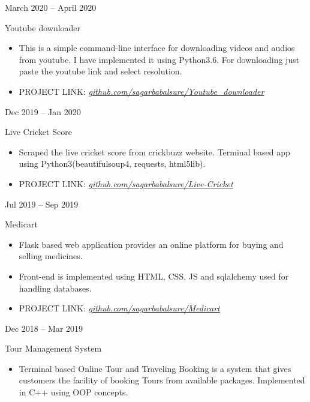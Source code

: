 \documentclass[a4paper,10pt]{article}
\newlength{\cvcolumngapwidth}
\newlength{\cvleftcolumnwidth}
\newlength{\cvrightcolumnwidth}
\newcommand{\cvtitlestyle}[1]{{\large\cvtitlefont\textcolor{cvtitlecolor}{#1}}}
\newcommand{\cvdurationstyle}[1]{{\small\cvdurationfont\textcolor{cvdurationcolor}{#1}}}
\newlength{\cvafteritemskipamount}
\newlength{\cvaftertitleskipamount}
\newlength{\cvparskip}
\newcommand{\cvitem}[2]{
    \begin{minipage}[t]{\cvleftcolumnwidth}
        \raggedleft #1
    \end{minipage}%
    \hspace{\cvcolumngapwidth}%
    \begin{minipage}[t]{\cvrightcolumnwidth}
        \setlength{\parskip}{\cvparskip} #2
    \end{minipage}

    \vspace{\cvafteritemskipamount}
}
\newcommand{\cvtitle}[1]{
    \cvtitlestyle{#1}

    \vspace{\cvaftertitleskipamount}
    \vspace{-\cvparskip}
}
\begin{document}
\cvitem{
    \cvdurationstyle{March 2020 -- April 2020}
}{
    \cvtitle{Youtube downloader}


    \begin{itemize}[leftmargin=*]
         \item This is a simple command-line interface for downloading videos and audios from youtube. I have implemented it using Python3.6. For downloading just paste the youtube link and select resolution.
         \item PROJECT LINK: \textit{\href{https://github.com/sagarbabalsure/Youtube_downloader}{github.com/sagarbabalsure/Youtube\_downloader}}
    \end{itemize}
}

\cvitem{
    \cvdurationstyle{Dec 2019 -- Jan 2020}
}{
    \cvtitle{Live Cricket Score}


    \begin{itemize}[leftmargin=*]
         \item Scraped the live cricket score from crickbuzz website. Terminal based app using Python3(beautifulsoup4, requests, html5lib).
         \item PROJECT LINK: \textit{\href{https://github.com/sagarbabalsure/Live-Cricket}{github.com/sagarbabalsure/Live-Cricket}}
    \end{itemize}
}

\cvitem{
    \cvdurationstyle{Jul 2019 -- Sep 2019}
}{
    \cvtitle{Medicart}


    \begin{itemize}[leftmargin=*]
         \item Flask based web application provides an online platform for buying and selling medicines.
        \item Front-end is implemented using HTML, CSS, JS and sqlalchemy used for handling databases.
         \item PROJECT LINK: \textit{\href{https://github.com/sagarbabalsure/Medicart}{github.com/sagarbabalsure/Medicart}}
    \end{itemize}
}

\cvitem{
    \cvdurationstyle{Dec 2018 -- Mar 2019}
}{
    \cvtitle{Tour Management System}


    \begin{itemize}[leftmargin=*]
         \item Terminal based Online Tour and Traveling Booking is a system that gives customers the facility of booking Tours from available packages. Implemented in C++ using OOP concepts. 
    \end{itemize}
}
\end{document}
